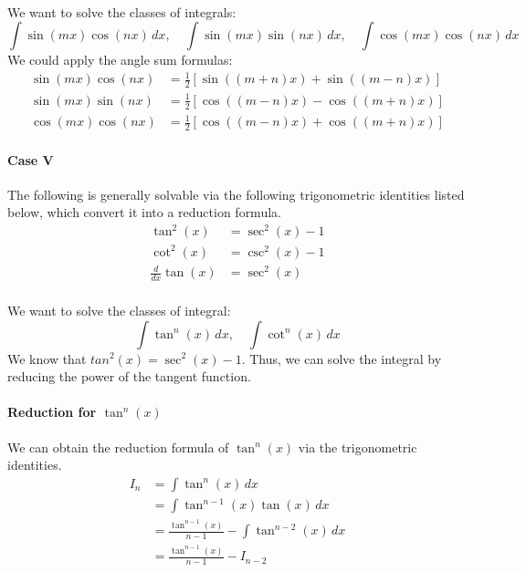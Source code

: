 \documentclass[11pt]{article}
\begin{document}
\paragraph{} We want to solve the classes of integrals:
\begin{equation}
    \int \sin(mx) \cos(nx) \, dx, \quad \int \sin(mx) \sin(nx) \, dx, \quad \int \cos(mx) \cos(nx) \, dx 
\end{equation}
We could apply the angle sum formulas:
\begin{align}
    \sin(mx)\cos(nx) &= \frac{1}{2} \left[ \sin((m+n)x) + \sin((m-n)x) \right] \\
    \sin(mx)\sin(nx) &= \frac{1}{2} \left[ \cos((m-n)x) - \cos((m+n)x) \right] \\
    \cos(mx)\cos(nx) &= \frac{1}{2} \left[ \cos((m-n)x) + \cos((m+n)x) \right]
\end{align}
\paragraph{Case V} The following is generally solvable via the following trigonometric identities listed below, which convert it into a reduction formula.
\begin{align}
    \tan^2(x) &= \sec^2(x) - 1 \label{eq:tan2} \\
    \cot^2(x) &= \csc^2(x) - 1 \label{eq:cot2}  \\
    \frac{d}{dx} \tan(x) &= \sec^2(x)
\end{align}
\paragraph{} We want to solve the classes of integral:
\begin{equation}
    \int \tan^n(x) \, dx, \quad \int \cot^n(x) \, dx 
\end{equation}
We know that $tan^2(x) = \sec^2(x) - 1$. Thus, we can solve the integral by reducing the power of the tangent function.
\paragraph{Reduction for $\tan^n(x)$} We can obtain the reduction formula of $\tan^n(x)$ via the trigonometric identities.
\begin{align}
    I_n &= \int \tan^n(x) \, dx \nonumber \\
    &= \int \tan^{n-1}(x) \tan(x) \, dx \nonumber \\
    &= \frac{\tan^{n-1}(x)}{n-1} - \int \tan^{n-2}(x) \, dx \nonumber \\
    &= \frac{\tan^{n-1}(x)}{n-1} - I_{n-2}
\end{align}
\end{document}
